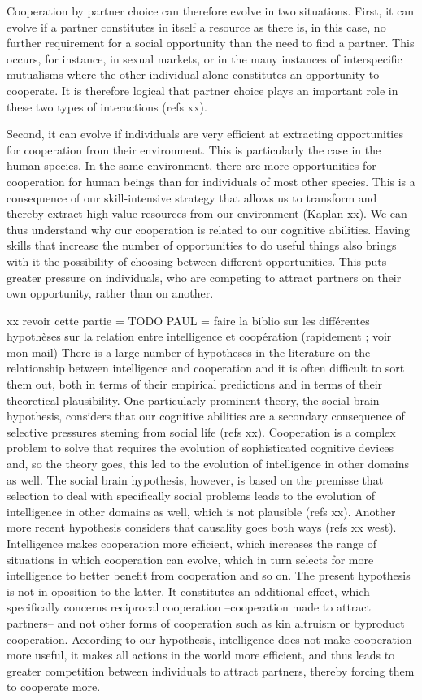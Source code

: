 Cooperation by partner choice can therefore evolve in two situations. First, it can evolve if a partner constitutes in itself a resource as there is, in this case,  no further requirement for a social opportunity than the need to find a partner. This occurs, for instance, in sexual markets, or in the many instances of interspecific mutualisms where the other individual alone constitutes an opportunity to cooperate. It is therefore logical that partner choice plays an important role in these two types of interactions (refs xx).

Second, it can evolve if individuals are very efficient at extracting opportunities for cooperation from their environment. This is particularly the case in the human species. In the same environment, there are more opportunities for cooperation for human beings than for individuals of most other species. This is a consequence of our skill-intensive strategy that allows us to transform and thereby extract high-value resources from our environment (Kaplan xx). We can thus understand why our cooperation is  related to our cognitive abilities. Having skills that increase the number of opportunities to do useful things also brings with it the possibility of choosing between different opportunities. This puts greater pressure on individuals, who are competing to attract partners on their own opportunity, rather than on another. 

xx revoir cette partie = TODO PAUL = faire la biblio sur les différentes hypothèses sur la relation entre intelligence et coopération (rapidement ; voir mon mail)
There is a large number of hypotheses in the literature on the relationship between intelligence and cooperation and it is often difficult to  sort them out, both in terms of their empirical predictions and in terms of their theoretical plausibility. One particularly prominent theory, the social brain hypothesis, considers that our cognitive abilities are a secondary consequence of selective pressures steming from social life (refs xx). Cooperation is a complex problem to solve that requires the evolution of sophisticated cognitive devices and, so the theory goes, this led to the evolution of intelligence in other domains as well. The social brain hypothesis, however, is based on the premisse that selection to deal with specifically social problems leads to the evolution of intelligence in other domains as well, which is not plausible (refs xx). Another more recent hypothesis considers that causality goes both ways (refs xx west). Intelligence makes cooperation more efficient, which increases the range of situations in which cooperation can evolve, which in turn selects for more intelligence to better benefit from cooperation and so on. The present hypothesis is not in oposition to the latter. It constitutes an additional effect, which specifically concerns reciprocal cooperation --cooperation made to attract partners-- and not other forms of cooperation such as kin altruism or byproduct cooperation. According to our hypothesis, intelligence does not make cooperation more useful, it makes all actions in the world more efficient, and thus leads to greater competition between individuals to attract partners, thereby forcing them to cooperate more.

